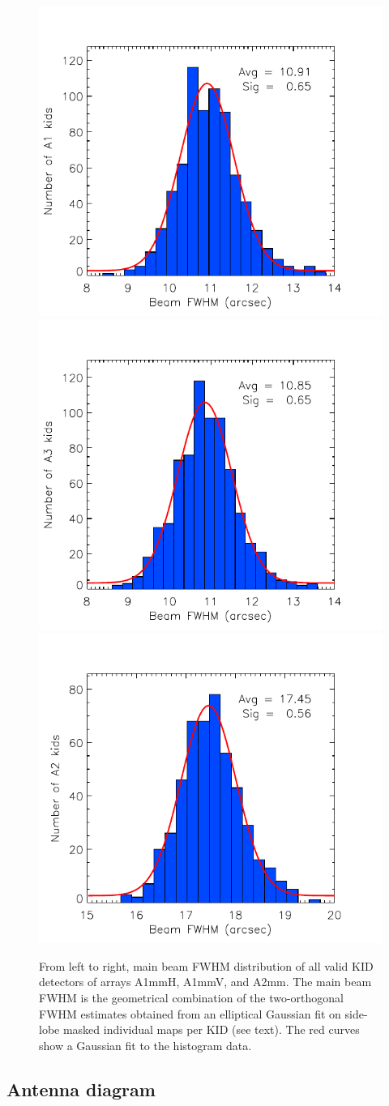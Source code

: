 \documentclass[]{aa} %
\begin{document}
\begin{figure}[h]
  \centering
  \includegraphics[clip=true,width=0.33\linewidth]{plot_histo_A1_fwhm_20170424s123.pdf}
  \includegraphics[clip=true,width=0.33\linewidth]{plot_histo_A3_fwhm_20170424s123.pdf}
  \includegraphics[clip=true,width=0.33\linewidth]{plot_histo_A2_fwhm_20170424s123.pdf}
  
\caption{From left to right, main beam FWHM distribution of all valid KID detectors of arrays A1mmH, A1mmV, and A2mm. The main beam FWHM is the geometrical combination of the two-orthogonal FWHM estimates obtained from an elliptical Gaussian fit on side-lobe masked individual maps per KID (see text). The red curves show a Gaussian fit to the histogram data.}
  \label{fig:focalplane_histo}
\end{figure}

\subsection{Antenna diagram}
\end{document}
